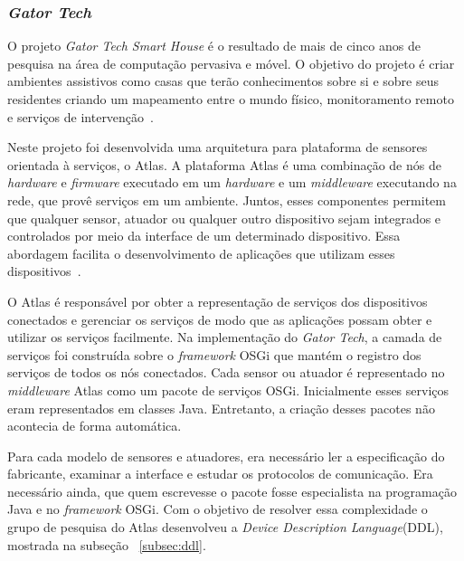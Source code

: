 \subsubsection{\emph{Gator Tech}}

O projeto \emph{Gator Tech Smart House} é o resultado de mais de cinco anos de pesquisa na área de computação pervasiva e móvel. O objetivo do projeto é criar ambientes assistivos como casas que terão conhecimentos sobre si e sobre seus residentes criando um mapeamento entre o mundo físico, monitoramento remoto e serviços de intervenção~\cite{gatorTech}.

Neste projeto foi desenvolvida uma arquitetura para plataforma de sensores orientada à serviços, o Atlas. A plataforma Atlas é uma combinação de nós de \emph{hardware} e \emph{firmware} executado em um \emph{hardware} e um \emph{middleware} executando na rede, que provê serviços em um ambiente. Juntos, esses componentes permitem que qualquer sensor, atuador ou qualquer outro dispositivo sejam integrados e controlados por meio da interface de um determinado dispositivo. Essa abordagem facilita o desenvolvimento de aplicações que utilizam esses dispositivos~\cite{gatorTechLessons}. 

O Atlas é responsável por obter a representação de serviços dos dispositivos conectados e gerenciar os serviços de modo que as aplicações possam obter e utilizar os serviços facilmente. Na implementação do \emph{Gator Tech}, a camada de serviços foi construída sobre o \emph{framework} OSGi que mantém o registro dos serviços de todos os nós conectados. Cada sensor ou atuador é representado no \emph{middleware} Atlas como um pacote de serviços OSGi. Inicialmente esses serviços eram representados em classes Java. Entretanto, a criação desses pacotes não acontecia de forma automática. 

Para cada modelo de sensores e atuadores, era necessário ler a especificação do fabricante, examinar a interface e estudar os protocolos de comunicação. Era necessário ainda, que quem escrevesse o pacote fosse especialista na programação Java e no \emph{framework} OSGi. Com o objetivo de resolver essa complexidade o grupo de pesquisa do Atlas desenvolveu a \emph{Device Description Language}(DDL), mostrada na subseção ~\ref{subsec:ddl}. 